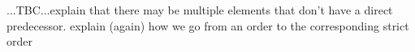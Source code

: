 

...TBC...explain that there may be multiple elements that don't have a direct predecessor. explain (again) how we go from an order to the corresponding strict order




